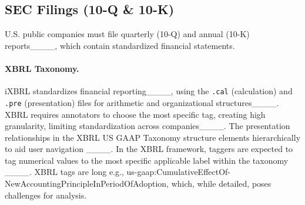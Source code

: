 \subsection{SEC Filings (10-Q \& 10-K)}
U.S. public companies must file quarterly (10-Q) and annual (10-K) reports____, which contain standardized financial statements.

\paragraph{XBRL Taxonomy.}
iXBRL standardizes financial reporting____, using the \texttt{.cal} (calculation) and \texttt{.pre} (presentation) files for arithmetic and organizational structures____. 
XBRL requires annotators to choose the most specific tag, creating high granularity, limiting standardization across companies____.
The presentation relationships in the XBRL US GAAP Taxonomy structure elements hierarchically to aid user navigation ____.
In the XBRL framework, taggers are expected to tag numerical values to the most specific applicable label within the taxonomy ____.
XBRL tags are long e.g., us-gaap:CumulativeEffectOf-NewAccountingPrincipleInPeriodOfAdoption, which, while detailed, poses challenges for analysis. 
